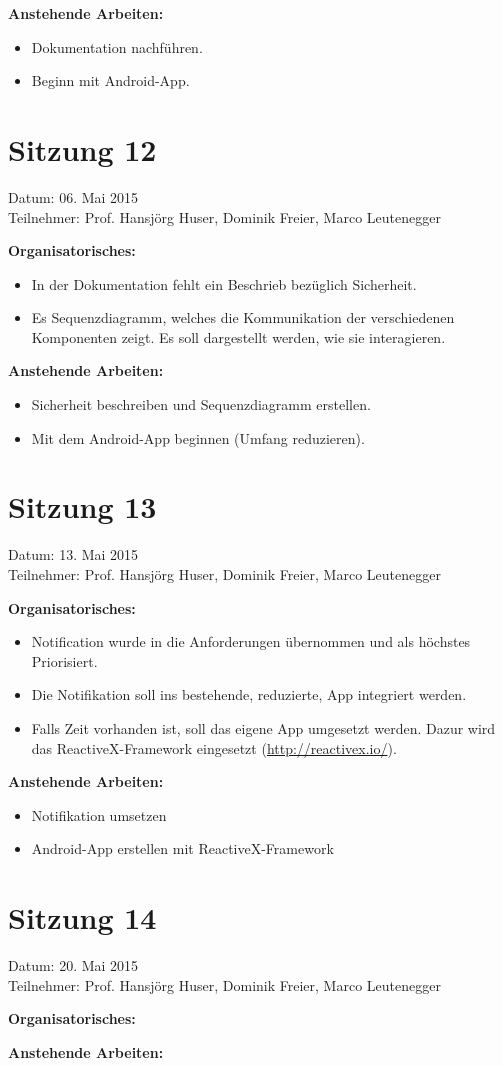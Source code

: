 	\textbf{Anstehende Arbeiten:}
	\begin{itemize}
		\item Dokumentation nachführen.
		\item Beginn mit Android-App.
	\end{itemize}

\section*{Sitzung 12}
	Datum: 06. Mai 2015 \\
	Teilnehmer: Prof. Hansjörg Huser, Dominik Freier, Marco Leutenegger

	\textbf{Organisatorisches:}
	\begin{itemize}
		\item In der Dokumentation fehlt ein Beschrieb bezüglich Sicherheit.
		\item Es Sequenzdiagramm, welches die Kommunikation der verschiedenen Komponenten zeigt. Es soll dargestellt werden, wie sie interagieren.
	\end{itemize}

	\textbf{Anstehende Arbeiten:}
	\begin{itemize}
		\item Sicherheit beschreiben und Sequenzdiagramm erstellen.
		\item Mit dem Android-App beginnen (Umfang reduzieren).
	\end{itemize}
	
\section*{Sitzung 13}
	Datum: 13. Mai 2015 \\
	Teilnehmer: Prof. Hansjörg Huser, Dominik Freier, Marco Leutenegger

	\textbf{Organisatorisches:}
	\begin{itemize}
		\item Notification wurde in die Anforderungen übernommen und als höchstes Priorisiert.
		\item Die Notifikation soll ins bestehende, reduzierte, App integriert werden.
		\item Falls Zeit vorhanden ist, soll das eigene App umgesetzt werden. Dazur wird das ReactiveX-Framework eingesetzt (\url{http://reactivex.io/}).
	\end{itemize}

	\textbf{Anstehende Arbeiten:}
	\begin{itemize}
		\item Notifikation umsetzen
		\item Android-App erstellen mit ReactiveX-Framework
	\end{itemize}

\section*{Sitzung 14}
	Datum: 20. Mai 2015 \\
	Teilnehmer: Prof. Hansjörg Huser, Dominik Freier, Marco Leutenegger

	\textbf{Organisatorisches:}

	\textbf{Anstehende Arbeiten:}
	